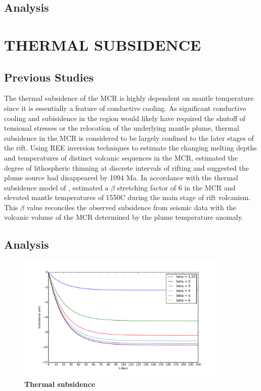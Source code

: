 \documentclass[12pt,letterpaper]{article}
\begin{document}
\subsection*{Analysis}

\section*{THERMAL SUBSIDENCE}
\subsection*{Previous Studies}
 
The thermal subsidence of the MCR is highly dependent on mantle temperature since it is essentially a feature of conductive cooling. As significant conductive cooling and subisidence in the region would likely have required the shutoff of tensional stresses or the relocation of the underlying mantle plume, thermal subsidence in the MCR is considered to be largely confined to the later stages of the rift. Using REE inversion techniques to estimate the changing melting depths and temperatures of distinct volcanic sequences in the MCR, \cite{White1997a} estimated the degree of lithospheric thinning at discrete intervals of rifting and suggested the plume source had disappeared by 1094 Ma. In accordance with the thermal subsidence model of \cite{McKenzie1978a}, \cite{White1997a} estimated a $\beta$ stretching factor of 6 in the MCR and elevated mantle temperatures of 1550\textdegree C during the main stage of rift volcanism. This $\beta$ value reconciles the observed subsidence from seismic data with the volcanic volume of the MCR determined by the plume temperature anomaly.\par

\subsection*{Analysis}

\begin{figure}
\noindent\includegraphics[width=0.9\textwidth]{../Code/Code_output/general_thermal_sub.pdf}
\caption{\textbf{\footnotesize{Thermal subsidence}}}
\label{fig:therm_sub}
\end{figure}
\end{document}
